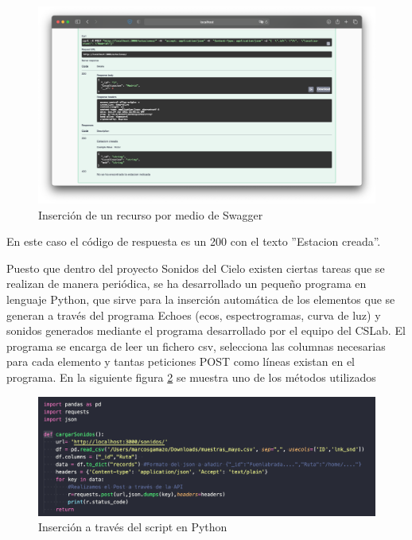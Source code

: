\begin{figure}[H]
    \centering
    \includegraphics[width=\textwidth]{include/resultados/SwaggerPost.png}
    \caption{Inserción de un recurso por medio de Swagger}
    \label{fig:swagger_post}
\end{figure}

En este caso el código de respuesta es un 200 con el texto ''Estacion creada''.

Puesto que dentro del proyecto Sonidos del Cielo existen ciertas tareas que se realizan de manera periódica, se ha desarrollado un pequeño programa en lenguaje Python, que sirve para la inserción automática de los elementos que se generan a través del programa Echoes (ecos, espectrogramas, curva de luz) y sonidos generados mediante el programa desarrollado por el equipo del CSLab. El programa se encarga de leer un fichero csv, selecciona las columnas necesarias para cada elemento y tantas peticiones POST como líneas existan en el programa. En la siguiente figura \ref{fig:insert_script} se muestra uno de los métodos utilizados

\begin{figure}[H]
    \centering
    \includegraphics[width=\textwidth]{include/resultados/InsertScript.png}
    \caption{Inserción a través del script en Python}
    \label{fig:insert_script}
\end{figure}


